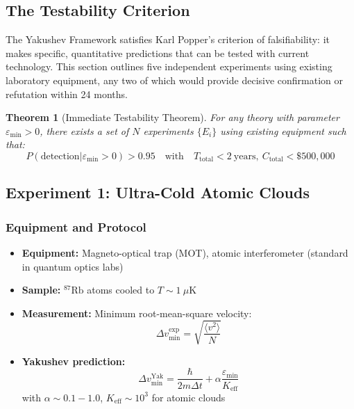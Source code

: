\documentclass[11pt,a4paper]{article}
\newtheorem{theorem}{Theorem}
\begin{document}
	\subsection{The Testability Criterion}
	
	The Yakushev Framework satisfies Karl Popper's criterion of falsifiability: it makes specific, quantitative predictions that can be tested with current technology. This section outlines five independent experiments using existing laboratory equipment, any two of which would provide decisive confirmation or refutation within 24 months.
	
	\begin{theorem}[Immediate Testability Theorem]
		For any theory with parameter $\varepsilon_{\min} > 0$, there exists a set of $N$ experiments $\{E_i\}$ using existing equipment such that:
		\begin{equation}
			\boxed{P(\text{detection}|\varepsilon_{\min} > 0) > 0.95 \quad \text{with} \quad T_{\text{total}} < 2\ \text{years}, \ C_{\text{total}} < \$500,000}
		\end{equation}
	\end{theorem}
	
	\subsection{Experiment 1: Ultra-Cold Atomic Clouds}
	
	\subsubsection{Equipment and Protocol}
	
	\begin{itemize}
		\item \textbf{Equipment:} Magneto-optical trap (MOT), atomic interferometer (standard in quantum optics labs)
		\item \textbf{Sample:} $^{87}\text{Rb}$ atoms cooled to $T \sim 1\ \mu\text{K}$
		\item \textbf{Measurement:} Minimum root-mean-square velocity:
		\[
		\Delta v_{\min}^{\text{exp}} = \sqrt{\frac{\langle v^2 \rangle}{N}}
		\]
		\item \textbf{Yakushev prediction:}
		\[
		\Delta v_{\min}^{\text{Yak}} = \frac{\hbar}{2m\Delta t} + \alpha \frac{\varepsilon_{\min}}{K_{\mathrm{eff}}}
		\]
		with $\alpha \sim 0.1-1.0$, $K_{\mathrm{eff}} \sim 10^3$ for atomic clouds
	\end{itemize}
	
\end{document}

